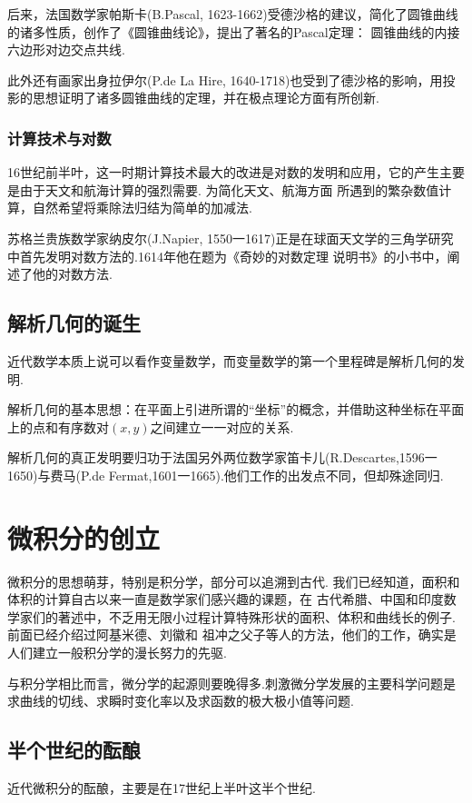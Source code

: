 \documentclass{Math_Note}
\begin{document}
后来，法国数学家帕斯卡(B.Pascal, 1623-1662)受德沙格的建议，简化了圆锥曲线的诸多性质，创作了《圆锥曲线论》，提出了著名的Pascal定理：
圆锥曲线的内接六边形对边交点共线. 

此外还有画家出身拉伊尔(P.de La Hire, 1640-1718)也受到了德沙格的影响，用投影的思想证明了诸多圆锥曲线的定理，并在极点理论方面有所创新. 

\subsubsection{计算技术与对数}
16世纪前半叶，这一时期计算技术最大的改进是对数的发明和应用，它的产生主要是由于天文和航海计算的强烈需要. 为简化天文、航海方面
所遇到的繁杂数值计算，自然希望将乘除法归结为简单的加减法. 

苏格兰贵族数学家纳皮尔(J.Napier, 1550一1617)正是在球面天文学的三角学研究中首先发明对数方法的.1614年他在题为《奇妙的对数定理
说明书》的小书中，阐述了他的对数方法. 

\subsection{解析几何的诞生}
近代数学本质上说可以看作变量数学，而变量数学的第一个里程碑是解析几何的发明. 

解析几何的基本思想：在平面上引进所谓的“坐标”的概念，并借助这种坐标在平面上的点和有序数对$(x,y)$之间建立一一对应的关系.

解析几何的真正发明要归功于法国另外两位数学家笛卡儿(R.Descartes,1596一1650)与费马(P.de Fermat,1601一1665).他们工作的出发点不同，但却殊途同归.

\section{微积分的创立}
微积分的思想萌芽，特别是积分学，部分可以追溯到古代. 我们已经知道，面积和体积的计算自古以来一直是数学家们感兴趣的课题，在
古代希腊、中国和印度数学家们的著述中，不乏用无限小过程计算特殊形状的面积、体积和曲线长的例子.前面已经介绍过阿基米德、刘徽和
祖冲之父子等人的方法，他们的工作，确实是人们建立一般积分学的漫长努力的先驱.

与积分学相比而言，微分学的起源则要晚得多.刺激微分学发展的主要科学问题是求曲线的切线、求瞬时变化率以及求函数的极大极小值等问题. 

\subsection{半个世纪的酝酿}
近代微积分的酝酿，主要是在17世纪上半叶这半个世纪.
\end{document}
